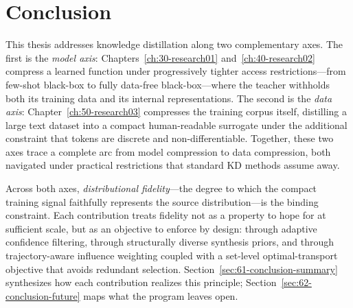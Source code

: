 \acresetall

\chapter{Conclusion} \label{ch:60-conclusion}

\begin{foldable}
  This thesis addresses knowledge distillation along two complementary axes.
  The first is the \textit{model axis}: Chapters~\ref{ch:30-research01} and~\ref{ch:40-research02} compress a learned function under progressively tighter access restrictions---from few-shot black-box to fully data-free black-box---where the teacher withholds both its training data and its internal representations.
  The second is the \textit{data axis}: Chapter~\ref{ch:50-research03} compresses the training corpus itself, distilling a large text dataset into a compact human-readable surrogate under the additional constraint that tokens are discrete and non-differentiable.
  Together, these two axes trace a complete arc from model compression to data compression, both navigated under practical restrictions that standard \ac{KD} methods assume away.
\end{foldable}

\begin{foldable}
  Across both axes, \textit{distributional fidelity}---the degree to which the compact training signal faithfully represents the source distribution---is the binding constraint.
  Each contribution treats fidelity not as a property to hope for at sufficient scale, but as an objective to enforce by design: through adaptive confidence filtering, through structurally diverse synthesis priors, and through trajectory-aware influence weighting coupled with a set-level optimal-transport objective that avoids redundant selection.
  Section~\ref{sec:61-conclusion-summary} synthesizes how each contribution realizes this principle; Section~\ref{sec:62-conclusion-future} maps what the program leaves open.
\end{foldable}



